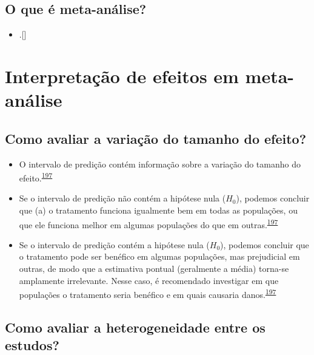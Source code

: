 \documentclass[
  a4paper,
]{book}
\providecommand{\tightlist}{%
  \setlength{\itemsep}{0pt}\setlength{\parskip}{0pt}}
\begin{document}
\hypertarget{o-que-uxe9-meta-anuxe1lise}{%
\subsection{O que é meta-análise?}\label{o-que-uxe9-meta-anuxe1lise}}

\begin{itemize}
\tightlist
\item
  .{[}{]}
\end{itemize}

\hypertarget{interpretacao}{%
\section{Interpretação de efeitos em meta-análise}\label{interpretacao}}

\hypertarget{como-avaliar-a-variauxe7uxe3o-do-tamanho-do-efeito}{%
\subsection{Como avaliar a variação do tamanho do efeito?}\label{como-avaliar-a-variauxe7uxe3o-do-tamanho-do-efeito}}

\begin{itemize}
\item
  O intervalo de predição contém informação sobre a variação do tamanho do efeito.\textsuperscript{\protect\hyperlink{ref-Borenstein2022}{197}}
\item
  Se o intervalo de predição não contém a hipótese nula (\(H_{0}\)), podemos concluir que (a) o tratamento funciona igualmente bem em todas as populações, ou que ele funciona melhor em algumas populações do que em outras.\textsuperscript{\protect\hyperlink{ref-Borenstein2022}{197}}
\item
  Se o intervalo de predição contém a hipótese nula (\(H_{0}\)), podemos concluir que o tratamento pode ser benéfico em algumas populações, mas prejudicial em outras, de modo que a estimativa pontual (geralmente a média) torna-se amplamente irrelevante. Nesse caso, é recomendado investigar em que populações o tratamento seria benéfico e em quais causaria danos.\textsuperscript{\protect\hyperlink{ref-Borenstein2022}{197}}
\end{itemize}

\hypertarget{como-avaliar-a-heterogeneidade-entre-os-estudos}{%
\subsection{Como avaliar a heterogeneidade entre os estudos?}\label{como-avaliar-a-heterogeneidade-entre-os-estudos}}
\end{document}
